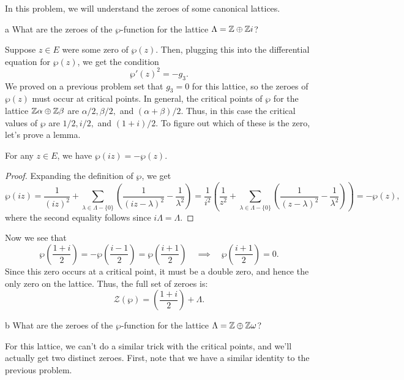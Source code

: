 \documentclass{pset}
\begin{document}
\begin{problem}{5.4}
  In this problem, we will understand the zeroes of some canonical lattices.
\end{problem}

\begin{parts}
  \begin{part}{a}
    What are the zeroes of the $\wp$-function for the lattice $\Lambda=\mathbb{Z}\oplus \mathbb{Z} i$?
  \end{part}

  Suppose $z\in E$ were some zero of $\wp(z)$. Then, plugging this into the differential equation for $\wp(z)$, we get the condition
  \[
    \wp'(z)^2 = -g_3.
  \]
  We proved on a previous problem set that $g_3=0$ for this lattice, so the zeroes of $\wp(z)$ must occur at critical points. In general, the critical points of $\wp$ for the lattice $\mathbb{Z}\alpha\oplus\mathbb{Z}\beta$ are $\alpha/2, \beta/2,$ and $(\alpha+\beta)/2$. Thus, in this case the critical values of $\wp$ are $1/2, i/2,$ and $(1+i)/2$. To figure out which of these is the zero, let's prove a lemma.

  \begin{claim}
    For any $z\in E$, we have $\wp(iz) = -\wp(z)$.
  \end{claim}
  \begin{proof}
    Expanding the definition of $\wp$, we get
    \[
      \wp(iz) = \frac{1}{(iz)^2}+\sum_{\lambda\in \Lambda -\{0\}}\left(\frac{1}{(iz-\lambda)^2}-\frac{1}{\lambda^2}\right) 
      = \frac{1}{i^2}\left(\frac{1}{z^2}+\sum_{\lambda\in \Lambda -\{0\}}\left(\frac{1}{(z-\lambda)^2}-\frac{1}{\lambda^2}\right)\right) = - \wp(z),
    \]
    where the second equality follows since $i\Lambda = \Lambda$.
  \end{proof}

  Now we see that
  \[
    \wp\left(\frac{1+i}{2}\right) = -\wp\left(\frac{i-1}{2}\right) = \wp\left(\frac{i+1}{2}\right) \quad\implies \quad \wp\left(\frac{i+1}{2}\right)=0.
  \]
  Since this zero occurs at a critical point, it must be a double zero, and hence the only zero on the lattice. Thus, the full set of zeroes is:
  \[
    \mathcal{Z}(\wp) = \left(\frac{1+i}{2}\right) + \Lambda.
  \]

  \begin{part}{b}
    What are the zeroes of the $\wp$-function for the lattice $\Lambda=\mathbb{Z}\oplus \mathbb{Z} \omega$?
  \end{part}

  For this lattice, we can't do a similar trick with the critical points, and we'll actually get two distinct zeroes. First, note that we have a similar identity to the previous problem.


\end{parts}
\end{document}
